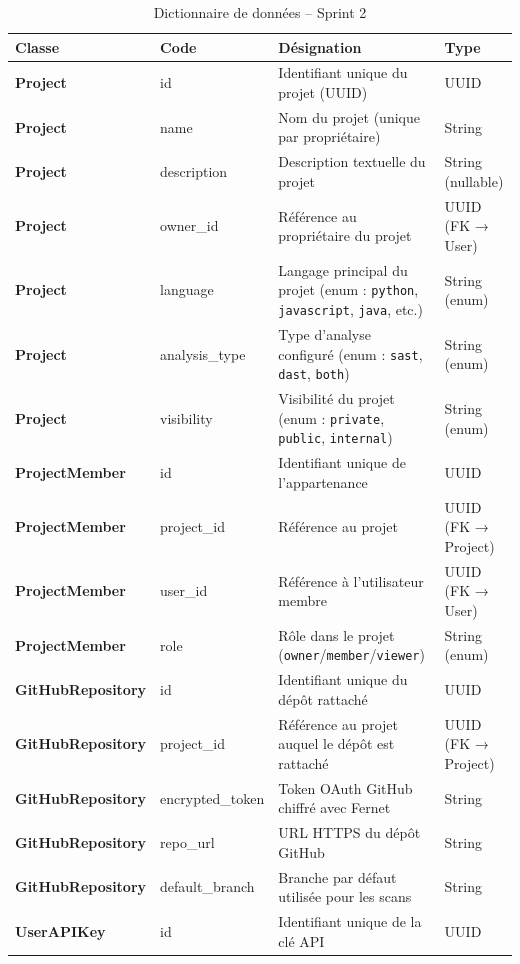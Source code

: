 \begin{table}[H]
\centering
\caption{Dictionnaire de données -- Sprint 2}
\label{tab:dict-sprint2}
\small
\renewcommand{\arraystretch}{1.3}
\begin{tabularx}{\textwidth}{>{\bfseries}p{2.8cm} p{3cm} X p{2.5cm}}
\hline
\rowcolor{gray!15}
\textbf{Classe} & \textbf{Code} & \textbf{Désignation} & \textbf{Type} \\
\hline
Project & id & Identifiant unique du projet (UUID) & UUID \\
Project & name & Nom du projet (unique par propriétaire) & String \\
Project & description & Description textuelle du projet & String (nullable) \\
Project & owner\_id & Référence au propriétaire du projet & UUID (FK → User) \\
Project & language & Langage principal du projet (enum : \texttt{python}, \texttt{javascript}, \texttt{java}, etc.) & String (enum) \\
Project & analysis\_type & Type d'analyse configuré (enum : \texttt{sast}, \texttt{dast}, \texttt{both}) & String (enum) \\
Project & visibility & Visibilité du projet (enum : \texttt{private}, \texttt{public}, \texttt{internal}) & String (enum) \\
\hline
ProjectMember & id & Identifiant unique de l'appartenance & UUID \\
ProjectMember & project\_id & Référence au projet & UUID (FK → Project) \\
ProjectMember & user\_id & Référence à l'utilisateur membre & UUID (FK → User) \\
ProjectMember & role & Rôle dans le projet (\texttt{owner}/\texttt{member}/\texttt{viewer}) & String (enum) \\
\hline
GitHubRepository & id & Identifiant unique du dépôt rattaché & UUID \\
GitHubRepository & project\_id & Référence au projet auquel le dépôt est rattaché & UUID (FK → Project) \\
GitHubRepository & encrypted\_token & Token OAuth GitHub chiffré avec Fernet & String \\
GitHubRepository & repo\_url & URL HTTPS du dépôt GitHub & String \\
GitHubRepository & default\_branch & Branche par défaut utilisée pour les scans & String \\
\hline
UserAPIKey & id & Identifiant unique de la clé API & UUID \\

\end{tabularx}
\end{table}
